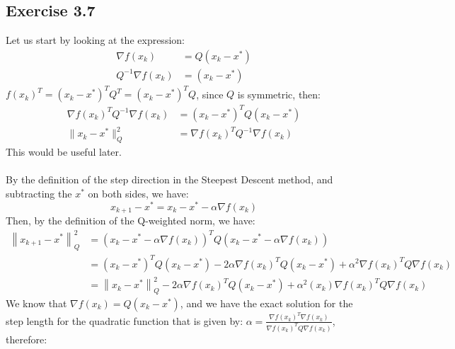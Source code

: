 \documentclass[a4paper]{article}
\begin{document}
\subsection{Exercise 3.7}
Let us start by looking at the expression:
\[
\begin{aligned}
\nabla f(x_k) &= Q\left(x_{k}-x^{*}\right)\\
Q^{-1}\nabla f(x_k) &= \left(x_{k}-x^{*}\right)
\end{aligned}
\]
$f(x_k)^T = \left(x_{k}-x^{*}\right)^TQ^T = \left(x_{k}-x^{*}\right)^TQ$, since $Q$ is symmetric, then:
\[
\begin{aligned}
\nabla f(x_k)^T Q^{-1}\nabla f(x_k) &= \left(x_{k}-x^{*}\right)^TQ\left(x_{k}-x^{*}\right)\\
 \| x_{k} - x^* \|_Q^2 &= \nabla f(x_k)^T Q^{-1}\nabla f(x_k)
\end{aligned}
\]
This would be useful later.\\\\
By the definition of the step direction in the Steepest Descent method, and subtracting the $x^*$ on
both sides, we have:
\[
x_{k+1} - x^* = x_k - x^* - \alpha\nabla f(x_k)
\]
Then, by the definition of the Q-weighted norm, we have:
\[
\begin{aligned}
  \left\|x_{k+1}-x^{*}\right\|_{Q}^{2} &=\left(x_{k}-x^{*}-\alpha \nabla f(x_k)\right)^{T} Q\left(x_{k}-x^{*}-\alpha
  \nabla f(x_k)\right) \\
  &=\left(x_{k}-x^{*}\right)^{T} Q\left(x_{k}-x^{*}\right)-2 \alpha \nabla f(x_k)^{T}
  Q\left(x_{k}-x^{*}\right)+\alpha^{2} \nabla f(x_k)^T Q \nabla f(x_k) \\
  &=\left\|x_{k}-x^{*}\right\|_{Q}^{2}-2 \alpha \nabla f(x_k)^{T}
  Q\left(x_{k}-x^{*}\right)+\alpha^{2}(x_k)
  \nabla f(x_k)^{T} Q \nabla f(x_k)
\end{aligned}
\]
We know that $\nabla f(x_k)=Q\left(x_{k}-x^{*}\right)$, and we have the exact solution
for the step length for the quadratic function that is given by:
$\alpha=\frac{\nabla f(x_k)^{T} \nabla f(x_k)}{\nabla f(x_k)^{T} Q \nabla f(x_k)}$, therefore:
\end{document}
